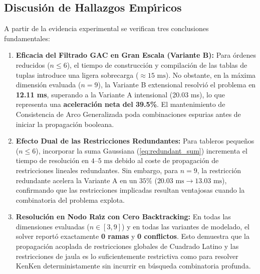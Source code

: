 \subsection{Discusi\'on de Hallazgos Emp\'{\i}ricos}
A partir de la evidencia experimental se verifican tres conclusiones fundamentales:

\begin{enumerate}
    \item \textbf{Eficacia del Filtrado GAC en Gran Escala (Variante B):} Para \'ordenes reducidos ($n \le 6$), el tiempo de construcci\'on y compilaci\'on de las tablas de tuplas introduce una ligera sobrecarga ($\approx 15\text{ ms}$). No obstante, en la m\'axima dimensi\'on evaluada ($n=9$), la Variante B extensional resolvi\'o el problema en \textbf{12.11 ms}, superando a la Variante A intensional (20.03 ms), lo que representa una \textbf{aceleraci\'on neta del 39.5\%}. El mantenimiento de Consistencia de Arco Generalizada poda combinaciones espurias antes de iniciar la propagaci\'on booleana.
    \item \textbf{Efecto Dual de las Restricciones Redundantes:} Para tableros peque\~nos ($n \le 6$), incorporar la suma Gaussiana (\ref{eq:redundant_sum}) incrementa el tiempo de resoluci\'on en $4$--$5\text{ ms}$ debido al coste de propagaci\'on de restricciones lineales redundantes. Sin embargo, para $n=9$, la restricci\'on redundante acelera la Variante A en un $35\%$ ($20.03\text{ ms} \to 13.03\text{ ms}$), confirmando que las restricciones implicadas resultan ventajosas cuando la combinatoria del problema explota.
    \item \textbf{Resoluci\'on en Nodo Ra\'{\i}z con Cero Backtracking:} En todas las dimensiones evaluadas ($n \in [3, 9]$) y en todas las variantes de modelado, el solver report\'o exactamente \textbf{0 ramas} y \textbf{0 conflictos}. Esto demuestra que la propagaci\'on acoplada de restricciones globales de Cuadrado Latino y las restricciones de jaula es lo suficientemente restrictiva como para resolver KenKen deterministamente sin incurrir en b\'usqueda combinatoria profunda.
\end{enumerate}
